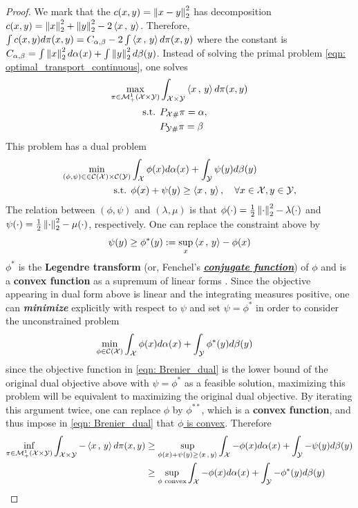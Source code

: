 \documentclass[11pt]{article}
\begin{document}
\begin{itemize}
\begin{proof}
We mark that the $c(x, y) = \left\|x -y\right\|_{2}^2$ has decomposition $c(x, y) = \left\|x\right\|_{2}^2 + \left\|y\right\|_{2}^2 - 2 \left\langle x\,,\, y \right\rangle$. Therefore,  $\int c(x,y) d\pi(x, y) = C_{\alpha, \beta} - 2 \int  \left\langle x\,,\, y \right\rangle d\pi(x, y)$ where the constant is $C_{\alpha, \beta} = \int \left\|x\right\|_{2}^2 d\alpha(x) + \int \left\|y\right\|_{2}^2 d\beta(y)$. Instead of solving the primal problem \eqref{eqn: optimal_transport_continuous}, one solves 
\begin{align*}
\max_{\pi \in {\mathcal M}_{+}^{1}({\mathcal X} \times {\mathcal Y})}& \int_{{\mathcal X} \times {\mathcal Y}} \left\langle x\,,\, y \right\rangle d \pi(x, y)   \\
\text{s.t. }& P_{{\mathcal X} \#}\pi = \alpha,  \nonumber \\
& P_{{\mathcal Y} \#}\pi = \beta  \nonumber
\end{align*} This problem has a dual problem 
\begin{align*}
 \min_{(\phi,  \psi) \in \in {\mathcal C}({\mathcal X})\times {\mathcal C}({\mathcal Y})} & \int_{{\mathcal X}}\phi(x) d\alpha(x) + \int_{{\mathcal Y}}\psi(y) d\beta(y) \\
\text{s.t. }&  \phi(x) + \psi(y) \ge \left\langle x\,,\, y \right\rangle,\quad \forall x\in {\mathcal X}, y \in {\mathcal Y},
\end{align*} The relation between $(\phi,  \psi)$ and $(\lambda, \mu)$ is that $\phi(\cdot) = \frac{1}{2}\left\|\cdot\right\|_{2}^2 - \lambda(\cdot)$ and $\psi(\cdot) = \frac{1}{2}\left\|\cdot\right\|_{2}^2 - \mu(\cdot)$, respectively. One can replace the constraint above by
\begin{align}
\psi(y) \ge \phi^{*}(y) := \sup_{x}\left\langle x\,,\, y \right\rangle - \phi(x) \label{eqn: Brenier_conjugate}
\end{align} $\phi^{*}$ is the \textbf{Legendre transform} (or, Fenchel's \underline{\emph{\textbf{conjugate function}}}) of $\phi$ and is a \textbf{convex function} as a supremum of linear forms \citep{rockafellar1970convex}. Since the objective appearing in dual form above is linear and the integrating measures positive, one can \emph{\textbf{minimize}} explicitly with respect to $\psi$ and set $\psi = \phi^{*}$ in order to consider the unconstrained problem 
\begin{align}
\min_{\phi\in {\mathcal C}({\mathcal X})} & \int_{{\mathcal X}}\phi(x) d\alpha(x) + \int_{{\mathcal Y}}\phi^{*}(y) d\beta(y) \label{eqn: Brenier_dual}
\end{align} since the objective function in \eqref{eqn: Brenier_dual} is the lower bound of the original dual objective above with $\psi = \phi^{*}$ as a feasible solution, maximizing this problem will be equivalent to maximizing the original dual objective.  By iterating this argument twice, one can replace $\phi$ by $\phi^{**}$, which is a \textbf{convex function}, and thus impose in \eqref{eqn: Brenier_dual} that \underline{$\phi$ is convex}. Therefore
\begin{align*}
\inf_{\pi \in {\mathcal M}_{+}^{1}({\mathcal X} \times {\mathcal Y})} \int_{{\mathcal X} \times {\mathcal Y}} -\left\langle x\,,\, y \right\rangle d \pi(x, y) &\ge \sup_{\phi(x) + \psi(y) \ge \left\langle x\,,\, y \right\rangle}\int_{{\mathcal X}}-\phi(x) d\alpha(x) + \int_{{\mathcal Y}}-\psi(y) d\beta(y) \\
&\ge \sup_{\phi \text{ convex}}\int_{{\mathcal X}}-\phi(x) d\alpha(x) + \int_{{\mathcal Y}}-\phi^{*}(y) d\beta(y)
\end{align*}


\end{proof}
\end{itemize}
\end{document}
